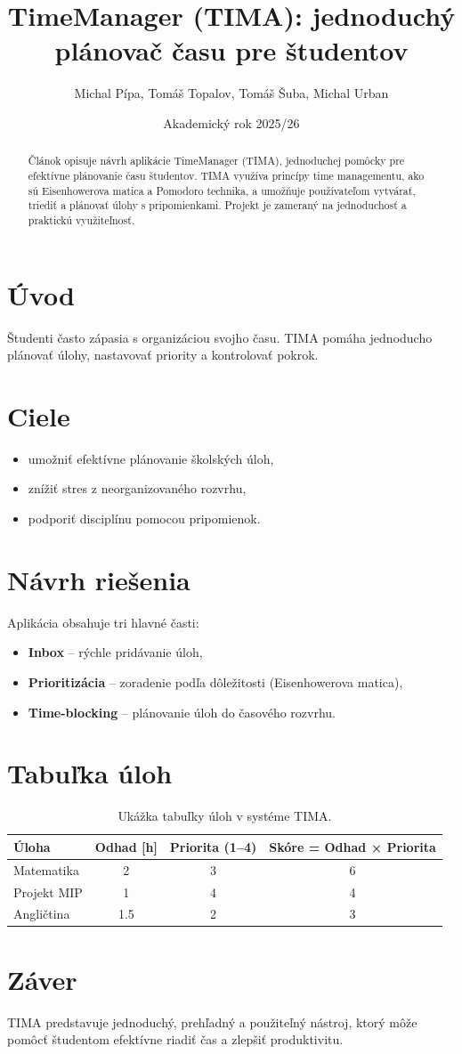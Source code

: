 \documentclass[11pt,a4paper]{article}
\title{TimeManager (TIMA): jednoduchý plánovač času pre študentov}
\author{Michal Pípa, Tomáš Topalov, Tomáš Šuba, Michal Urban}
\date{Akademický rok 2025/26}
\begin{document}
\maketitle

\begin{abstract}
Článok opisuje návrh aplikácie TimeManager (TIMA), jednoduchej pomôcky pre efektívne plánovanie času študentov.
TIMA využíva princípy time managementu, ako sú Eisenhowerova matica a Pomodoro technika, a umožňuje používateľom
vytvárať, triediť a plánovať úlohy s pripomienkami. Projekt je zameraný na jednoduchosť a praktickú využiteľnosť.
\end{abstract}

\section{Úvod}
Študenti často zápasia s organizáciou svojho času. TIMA pomáha jednoducho plánovať úlohy, nastavovať priority a kontrolovať pokrok.

\section{Ciele}
\begin{itemize}
\item umožniť efektívne plánovanie školských úloh,
\item znížiť stres z neorganizovaného rozvrhu,
\item podporiť disciplínu pomocou pripomienok.
\end{itemize}

\section{Návrh riešenia}
Aplikácia obsahuje tri hlavné časti:
\begin{itemize}
\item \textbf{Inbox} – rýchle pridávanie úloh,
\item \textbf{Prioritizácia} – zoradenie podľa dôležitosti (Eisenhowerova matica),
\item \textbf{Time-blocking} – plánovanie úloh do časového rozvrhu.
\end{itemize}

\section{Tabuľka úloh}
\begin{table}[H]
\centering
\begin{tabular}{|l|c|c|c|}
\hline
Úloha & Odhad [h] & Priorita (1--4) & Skóre = Odhad × Priorita \\
\hline
Matematika & 2 & 3 & 6 \\
Projekt MIP & 1 & 4 & 4 \\
Angličtina & 1.5 & 2 & 3 \\
\hline
\end{tabular}
\caption{Ukážka tabuľky úloh v systéme TIMA.}
\end{table}

\section{Záver}
TIMA predstavuje jednoduchý, prehľadný a použiteľný nástroj, ktorý môže pomôcť študentom efektívne riadiť čas a zlepšiť produktivitu.



\end{document}
